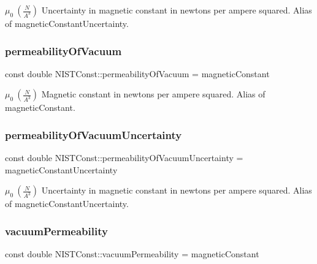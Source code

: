 $\mu_0 \ (\frac{N}{A^3})$ Uncertainty in magnetic constant in newtons per ampere squared. Alias of magnetic\+Constant\+Uncertainty. \mbox{\label{group___n_i_s_t_const-_magnetic_constant_ga7210c41dfc8fb9dbc41c83282eafebc6}} 
\subsubsection{\texorpdfstring{permeability\+Of\+Vacuum}{permeabilityOfVacuum}}
{\footnotesize\ttfamily const double N\+I\+S\+T\+Const\+::permeability\+Of\+Vacuum = magnetic\+Constant}

$\mu_0 \ (\frac{N}{A^3})$ Magnetic constant in newtons per ampere squared. Alias of magnetic\+Constant. \mbox{\label{group___n_i_s_t_const-_magnetic_constant_gaa30d6a001f3d52ea07c50ff9c921c8e9}} 
\subsubsection{\texorpdfstring{permeability\+Of\+Vacuum\+Uncertainty}{permeabilityOfVacuumUncertainty}}
{\footnotesize\ttfamily const double N\+I\+S\+T\+Const\+::permeability\+Of\+Vacuum\+Uncertainty = magnetic\+Constant\+Uncertainty}

$\mu_0 \ (\frac{N}{A^3})$ Uncertainty in magnetic constant in newtons per ampere squared. Alias of magnetic\+Constant\+Uncertainty. \mbox{\label{group___n_i_s_t_const-_magnetic_constant_ga2bf51bbe9c6b75752250c9b133758223}} 
\subsubsection{\texorpdfstring{vacuum\+Permeability}{vacuumPermeability}}
{\footnotesize\ttfamily const double N\+I\+S\+T\+Const\+::vacuum\+Permeability = magnetic\+Constant}

